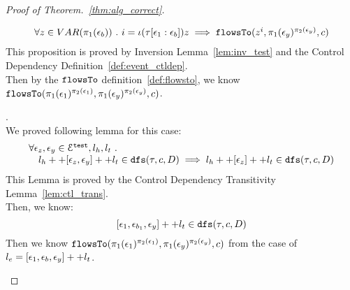 \begin{proof}[Proof of Theorem.~\ref{thm:alg_correct}]
\begin{case}
\begin{subcase}[One Testing Event: $l_e = {[\event_1, \event_b, \event_y]} ++ l_t$ ]
%
  \begin{equation}
  \begin{array}{l}
    \forall z \in VAR(\pi_1(\mathtt{\epsilon}_b)) ~.~ i = \iota(\mathtt{\tau}[\mathtt{\epsilon}_1:\mathtt{\epsilon}_b]) z \implies
    \mathtt{flowsTo}(z^i, \pi_1(\mathtt{\epsilon}_y)^{\pi_2(\mathtt{\epsilon}_y)}, c)
  \end{array}
  \end{equation}
%
This proposition is proved by Inversion Lemma~\ref{lem:inv_test} and the Control Dependency Definition~\ref{def:event_ctldep}.
%
\\
Then by the $\mathtt{flowsTo}$ definition~\ref{def:flowsto}, we know $\mathtt{flowsTo}(\pi_1(\mathtt{\epsilon}_1)^{\pi_2(\mathtt{\epsilon}_1)}, \pi_1(\mathtt{\epsilon}_y)^{\pi_2(\mathtt{\epsilon}_y)}, c) $.
\end{subcase}
%
%
\begin{subcase}[ $l_e = {[\event_1, \event_{b_1}, \cdots, \event_{b_n}, \event_y]} ++ l_t$ ].
%
\\
We proved following lemma for this case:
\begin{equation}
  \begin{array}{l}
    \forall \mathtt{\epsilon}_z, \mathtt{\epsilon}_y \in \mathcal{E}^{\mathtt{{test}}}, l_h, l_t ~.~
     \\ \quad 
     l_h ++ [\mathtt{\epsilon}_z, \mathtt{\epsilon}_y] ++ l_t \in \mathtt{dfs}(\mathtt{\tau}, c, D)
    \implies l_h ++ [\mathtt{\epsilon}_z] ++ l_t \in \mathtt{dfs}(\mathtt{\tau}, c, D)
  \end{array}
  \end{equation}
%
This Lemma is proved by the Control Dependency Transitivity Lemma~\ref{lem:ctl_trans}.
\\
Then, we know:
\[
  {[\mathtt{\epsilon}_1, \mathtt{\epsilon}_{b_1}, \mathtt{\epsilon}_y]} ++ l_t \in \mathtt{dfs}(\mathtt{\tau}, c, D)
\]
Then we know $\mathtt{flowsTo}(\pi_1(\mathtt{\epsilon}_1)^{\pi_2(\mathtt{\epsilon}_1)}, \pi_1(\mathtt{\epsilon}_y)^{\pi_2(\mathtt{\epsilon}_y)}, c) $ from the case of 
$l_e = [\mathtt{\epsilon}_1, \mathtt{\epsilon}_{b}, \mathtt{\epsilon}_y] ++ l_t$.
\end{subcase}
%
\end{case}
%
\end{proof}